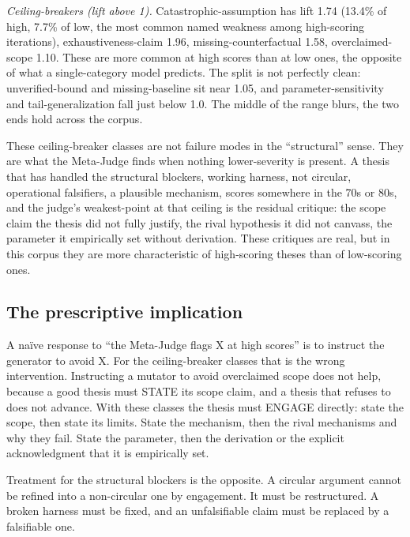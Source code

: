 \documentclass[
  11pt,
]{article}
\begin{document}
\emph{Ceiling-breakers (lift above 1).} Catastrophic-assumption has lift
1.74 (13.4\% of high, 7.7\% of low, the most common named weakness among
high-scoring iterations), exhaustiveness-claim 1.96, missing-counterfactual
1.58, overclaimed-scope 1.10. These are more common at high scores than at
low ones, the opposite of what a single-category model predicts. The split
is not perfectly clean: unverified-bound and missing-baseline sit near
1.05, and parameter-sensitivity and tail-generalization fall just below
1.0. The middle of the range blurs, the two ends hold across the corpus.

These ceiling-breaker classes are not failure modes in the ``structural''
sense. They are what the Meta-Judge finds when nothing lower-severity is
present. A thesis that has handled the structural blockers, working
harness, not circular, operational falsifiers, a plausible
mechanism, scores somewhere in the 70s or 80s, and the judge's
weakest-point at that ceiling is the residual critique: the scope claim
the thesis did not fully justify, the rival hypothesis it did not canvass,
the parameter it empirically set without derivation. These critiques are
real, but in this corpus they are more characteristic of high-scoring
theses than of low-scoring ones.

\subsection{The prescriptive
implication}\label{the-prescriptive-implication}

A naïve response to ``the Meta-Judge flags X at high scores'' is to
instruct the generator to avoid X. For the ceiling-breaker classes that is
the wrong intervention. Instructing a mutator to avoid overclaimed
scope does not help, because a good thesis must STATE its scope claim, and
a thesis that refuses to does not advance. With these classes the thesis
must ENGAGE directly: state the scope, then state
its limits. State the mechanism, then the rival mechanisms and why
they fail. State the parameter, then the derivation or the explicit
acknowledgment that it is empirically set.

Treatment for the structural blockers is the opposite. A circular
argument cannot be refined into a non-circular one by engagement. It must
be restructured. A broken harness must be fixed, and an unfalsifiable
claim must be replaced by a falsifiable one.
\end{document}
